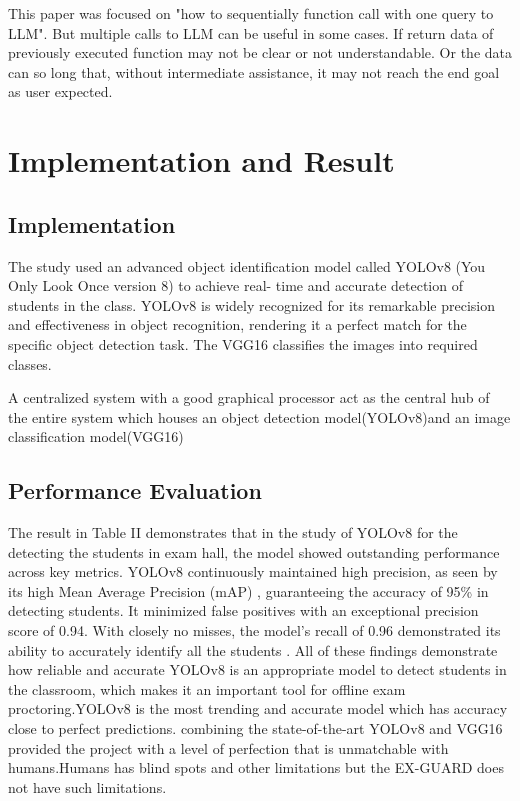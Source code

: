 \documentclass[conference]{IEEEtran}
\begin{document}
This paper was focused on "how to sequentially function call with one query to LLM". But multiple calls to LLM can be useful in some cases. If return data of previously executed function may not be clear or not understandable. Or the data can so long that, without intermediate assistance, it may not reach the end goal as user expected.

\section{Implementation and Result}
\subsection{Implementation}
The study used an advanced object identification model called YOLOv8 (You Only Look Once version 8) to achieve real- time and accurate detection of students in the class. YOLOv8 is widely recognized for its remarkable precision and effectiveness in object recognition, rendering it a perfect match for the specific object detection task. The VGG16 classifies the images into required classes.

A centralized system with a good graphical processor act as the central hub of the entire system which houses an object detection model(YOLOv8)and an image classification model(VGG16)

\subsection{Performance Evaluation}
The result in Table II demonstrates that in the study of YOLOv8 for the detecting the students in exam hall, the model showed outstanding performance across key metrics.
YOLOv8 continuously maintained high precision, as seen by its high Mean Average Precision (mAP) , guaranteeing the accuracy of 95\% in detecting students. It minimized false positives with an exceptional precision score of 0.94. With closely no misses, the model’s recall of 0.96 demonstrated its ability to accurately identify all the  students .
All of these findings demonstrate how reliable and accurate YOLOv8 is an appropriate model to detect students in the classroom, which makes it an important tool for offline exam proctoring.YOLOv8 is the most trending and accurate model which has accuracy close to perfect predictions. combining the state-of-the-art YOLOv8 and VGG16 provided the project with a level of perfection that is unmatchable with humans.Humans has blind spots and other limitations but the EX-GUARD does not have such limitations.
\end{document}
